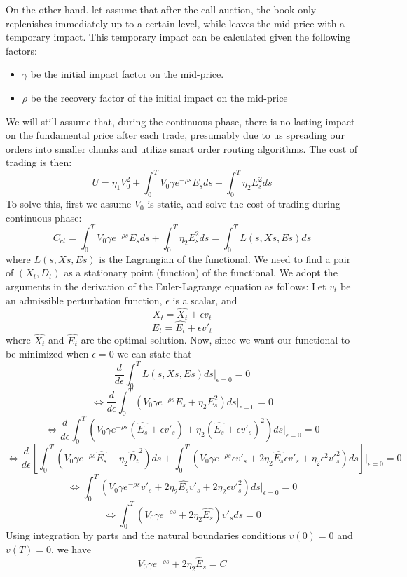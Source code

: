 \documentclass{article}
\begin{document}
On the other hand. let assume that after the call auction, the book only replenishes immediately up to a certain level, while leaves the mid-price with a temporary impact. This temporary impact can be calculated given the following factors:
\begin{itemize}
\item $\gamma$ be the initial impact factor on the mid-price.
\item $\rho$ be the recovery factor of the initial impact on the mid-price
\end{itemize}
We will still assume that, during the continuous phase, there is no lasting impact on the fundamental price after each trade, presumably due to us spreading our orders into smaller chunks and utilize smart order routing algorithms. The cost of trading is then:
\[
U = \eta_1 V_0^2  + \int_0^T V_0 \gamma e^{-\rho s} E_s ds + \int_0^T \eta_2 E_s^2 ds
\]
To solve this, first we assume $V_0$ is static, and solve the cost of trading during continuous phase:
\[
C_{ct} = \int_0^T V_0 \gamma e^{-\rho s} E_s ds + \int_0^T \eta_2 E_s^2 ds = \int_0^T L(s, Xs, Es) ds
\]
where $ L(s, Xs, Es)$ is the Lagrangian of the functional. We need to find a pair of $(X_t, D_t)$ as a stationary point (function) of the functional. We adopt the arguments in the derivation of the Euler-Lagrange equation as follows:
Let $v_t$ be an admissible perturbation function, $\epsilon$ is a scalar, and
\[
X_t = \hat{X_t} + \epsilon v_t 
\]
\[
E_t = \hat{E_t} + \epsilon {v'}_t 
\]
where $\hat{X_t}$ and $\hat{E_t}$ are the optimal solution. Now, since we want our functional to be minimized when $\epsilon=0$ we can state that
\[
\frac{d}{d\epsilon} \int_0^T L(s, Xs, Es) ds|_{\epsilon=0}=0
\]
\[
\Leftrightarrow \frac{d}{d\epsilon} \int_0^T (V_0 \gamma e^{-\rho s} E_s + \eta_2 E_s^2) ds|_{\epsilon=0}=0
\]
\[
\Leftrightarrow \frac{d}{d\epsilon} \int_0^T (V_0 \gamma e^{-\rho s} (\hat{E_s} + \epsilon {v'}_s) + \eta_2 (\hat{E_s} + \epsilon {v'}_s)^2) ds|_{\epsilon=0}=0
\]
\[
\Leftrightarrow \frac{d}{d\epsilon} \left[\int_0^T (V_0 \gamma e^{-\rho s} \hat{E_s} + \eta_2 \hat{D_t}^2 ) ds  + \int_0^T (V_0 \gamma e^{-\rho s}\epsilon {v'}_s + 2\eta_2\hat{E_s}\epsilon{v'}_s + \eta_2\epsilon^2{v'}^2_s)ds\right]|_{\epsilon=0}=0
\]
\[
\Leftrightarrow \int_0^T (V_0 \gamma e^{-\rho s} {v'}_s + 2\eta_2\hat{E_s}{v'}_s + 2\eta_2\epsilon{v'}^2_s)ds|_{\epsilon=0} = 0
\]
\[
\Leftrightarrow \int_0^T (V_0 \gamma e^{-\rho s}  + 2\eta_2\hat{E_s}) {v'}_s ds = 0
\]
Using integration by parts and the natural boundaries conditions $v(0)=0$ and $v(T)=0$, we have
\[
V_0 \gamma e^{-\rho s}  + 2\eta_2\hat{E_s} = C
\]
\end{document}
